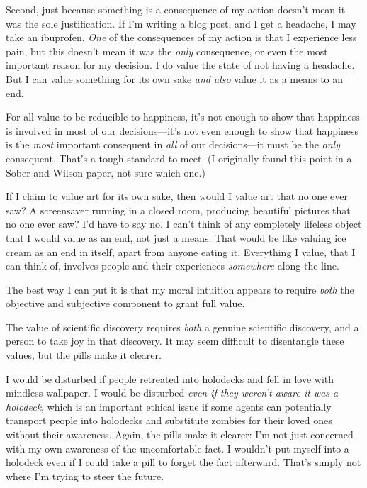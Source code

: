 {
 Second, just because something is a consequence of my action
doesn't mean it was the sole justification. If
I'm writing a blog post, and I get a headache, I may
take an ibuprofen. \textit{One} of the consequences of my action is
that I experience less pain, but this doesn't mean it
was the \textit{only} consequence, or even the most important reason
for my decision. I do value the state of not having a headache. But I
can value something for its own sake \textit{and also} value it as a
means to an end.}

{
 For all value to be reducible to happiness, it's
not enough to show that happiness is involved in most of our
decisions---it's not even enough to show that happiness
is the \textit{most} important consequent in \textit{all} of our
decisions---it must be the \textit{only} consequent.
That's a tough standard to meet. (I originally found
this point in a Sober and Wilson paper, not sure which one.)}

{
 If I claim to value art for its own sake, then would I value art
that no one ever saw? A screensaver running in a closed room, producing
beautiful pictures that no one ever saw? I'd have to
say no. I can't think of any completely lifeless object
that I would value as an end, not just a means. That would be like
valuing ice cream as an end in itself, apart from anyone eating it.
Everything I value, that I can think of, involves people and their
experiences \textit{somewhere} along the line.}

{
 The best way I can put it is that my moral intuition appears to
require \textit{both} the objective and subjective component to grant
full value.}

{
 The value of scientific discovery requires \textit{both} a genuine
scientific discovery, and a person to take joy in that discovery. It
may seem difficult to disentangle these values, but the pills make it
clearer.}

{
 I would be disturbed if people retreated into holodecks and fell
in love with mindless wallpaper. I would be disturbed \textit{even if
they weren't aware it was a holodeck}, which is an
important ethical issue if some agents can potentially transport people
into holodecks and substitute zombies for their loved ones without
their awareness. Again, the pills make it clearer: I'm
not just concerned with my own awareness of the uncomfortable fact. I
wouldn't put myself into a holodeck even if I could
take a pill to forget the fact afterward. That's simply
not where I'm trying to steer the future.}

